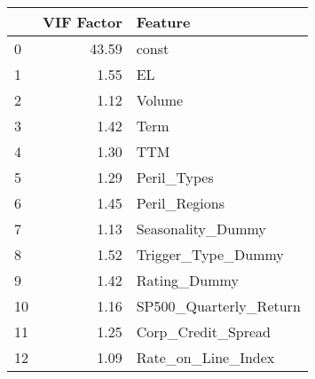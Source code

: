 \begin{tabular}{lrl}
\toprule
{} &  VIF Factor &                 Feature \\
\midrule
0  &       43.59 &                   const \\
1  &        1.55 &                      EL \\
2  &        1.12 &                  Volume \\
3  &        1.42 &                    Term \\
4  &        1.30 &                     TTM \\
5  &        1.29 &             Peril\_Types \\
6  &        1.45 &           Peril\_Regions \\
7  &        1.13 &       Seasonality\_Dummy \\
8  &        1.52 &      Trigger\_Type\_Dummy \\
9  &        1.42 &            Rating\_Dummy \\
10 &        1.16 &  SP500\_Quarterly\_Return \\
11 &        1.25 &      Corp\_Credit\_Spread \\
12 &        1.09 &      Rate\_on\_Line\_Index \\
\bottomrule
\end{tabular}
